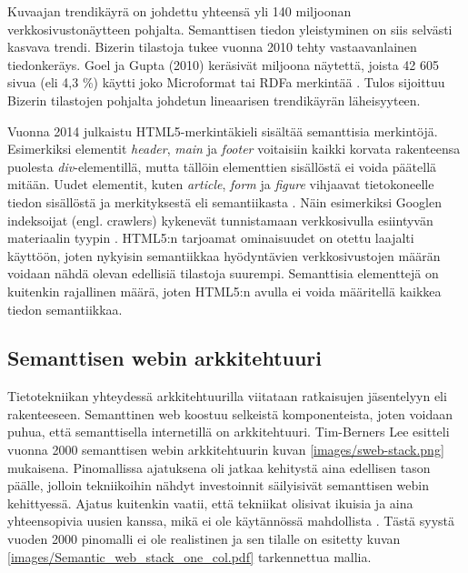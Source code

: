 \documentclass[finnish, 12pt, a4paper, elec, utf8, pdfa, online]{aaltothesis}
\begin{document}
{Kuvaajan trendikäyrä on johdettu yhteensä yli 140 miljoonan verkkosivustonäytteen pohjalta. Semanttisen tiedon yleistyminen on siis selvästi kasvava trendi. Bizerin tilastoja tukee vuonna 2010 tehty vastaavanlainen tiedonkeräys. Goel ja Gupta (2010) keräsivät miljoona näytettä, joista 42 605 sivua (eli 4,3 \%) käytti joko Microformat tai RDFa merkintää \cite{Google}. Tulos sijoittuu Bizerin tilastojen pohjalta johdetun lineaarisen trendikäyrän läheisyyteen.

Vuonna 2014 julkaistu HTML5-merkintäkieli sisältää semanttisia merkintöjä. Esimerkiksi elementit \textit{header}, \textit{main} ja \textit{footer} voitaisiin kaikki korvata rakenteensa puolesta \textit{div}-elementillä, mutta tällöin elementtien sisällöstä ei voida päätellä mitään. Uudet elementit, kuten \textit{article}, \textit{form} ja \textit{figure} vihjaavat tietokoneelle tiedon sisällöstä ja merkityksestä eli semantiikasta \cite{html5}. Näin esimerkiksi Googlen indeksoijat (engl. crawlers) kykenevät tunnistamaan verkkosivulla esiintyvän materiaalin tyypin \cite{html5}. HTML5:n tarjoamat ominaisuudet on otettu laajalti käyttöön, joten nykyisin semantiikkaa hyödyntävien verkkosivustojen määrän voidaan nähdä olevan edellisiä tilastoja suurempi. Semanttisia elementtejä on kuitenkin rajallinen määrä, joten HTML5:n avulla ei voida määritellä kaikkea tiedon semantiikkaa.

\subsection{Semanttisen webin arkkitehtuuri}
Tietotekniikan yhteydessä arkkitehtuurilla viitataan ratkaisujen jäsentelyyn eli rakenteeseen. Semanttinen web koostuu selkeistä komponenteista, joten voidaan puhua, että semanttisella internetillä on arkkitehtuuri. Tim-Berners Lee esitteli vuonna 2000 semanttisen webin arkkitehtuurin kuvan \ref{images/sweb-stack.png} mukaisena. Pinomallissa ajatuksena oli jatkaa kehitystä aina edellisen tason päälle, jolloin tekniikoihin nähdyt investoinnit säilyisivät semanttisen webin kehittyessä. Ajatus kuitenkin vaatii, että tekniikat olisivat ikuisia ja aina yhteensopivia uusien kanssa, mikä ei ole käytännössä mahdollista \cite{stack}. Tästä syystä vuoden 2000 pinomalli ei ole realistinen ja sen tilalle on esitetty kuvan \ref{images/Semantic_web_stack_one_col.pdf} tarkennettua mallia.

}
\end{document}
